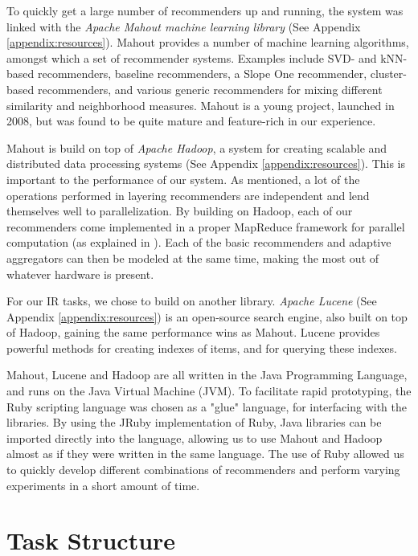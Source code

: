 To quickly get a large number of recommenders up and running,
the system was linked with the \emph{Apache Mahout machine learning library}
(See Appendix \ref{appendix:resources}). 
Mahout provides a number of machine learning
algorithms, amongst which a set of recommender systems.
Examples include SVD- and kNN-based recommenders,
baseline recommenders, a Slope One recommender,
cluster-based recommenders,
and various generic recommenders for mixing different 
similarity and neighborhood measures.
Mahout is a young project, launched in 2008, 
but was found to be quite mature and feature-rich
in our experience.

Mahout is build on top of \emph{Apache Hadoop},
a system for creating scalable and distributed data processing systems 
(See Appendix \ref{appendix:resources}).
This is important to the performance of our system.
As mentioned, a lot of the operations performed in layering recommenders
are independent and lend themselves well to parallelization.
By building on Hadoop, each of our recommenders come implemented in a 
proper MapReduce framework for parallel computation (as explained in \citet[p75]{Manning2008}).
Each of the basic recommenders and adaptive aggregators can then be modeled at the same time,
making the most out of whatever hardware is present.

For our IR tasks, we chose to build on another library.
\emph{Apache Lucene} (See Appendix \ref{appendix:resources}) is an open-source search engine, also built on top of Hadoop,
gaining the same performance wins as Mahout.
Lucene provides powerful methods for creating indexes of items, and for querying these indexes.

Mahout, Lucene and Hadoop are all written in the Java Programming Language,
and runs on the Java Virtual Machine (JVM).
To facilitate rapid prototyping, the Ruby scripting language was chosen as a "glue" language,
for interfacing with the libraries. 
By using the JRuby implementation of Ruby, Java libraries can be imported directly
into the language, allowing us to use Mahout and Hadoop almost as if they were written in the same language.
The use of Ruby allowed us to quickly develop different combinations of recommenders and
perform varying experiments in a short amount of time.

\section{Task Structure}

